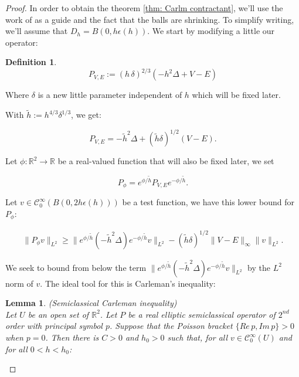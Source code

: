 \documentclass[leqno,11pt,letterpaper, english]{amsart}
\theoremstyle{plain}
\newtheorem{lem}[prop]{Lemma}
\theoremstyle{definition}
\newtheorem{defn}[prop]{Definition}
\numberwithin{equation}{section}
\def\R{\mathbb R}
\begin{document}
	\begin{proof}
		
		In order to obtain the theorem \ref{thm: Carlm contractant}, we'll use the work of \cite{kloppSemiclassicalResolventEstimates2019a} as a guide and the fact that the balls are shrinking. To simplify writing, we'll assume that $D_h=B(0,h\epsilon(h))$. 
		We start by modifying a little our operator:
		
		\begin{defn}
			
			\begin{equation}
				P_{V,E}:= \left(h\,\delta\right)^{2/3}(-h^2 \Delta+V-E)
			\end{equation}
			
			Where $\delta$ is a new little parameter independent of $h$ which will be fixed later.
		\end{defn}
		
		With $\tilde{h}:=h^{4/3}\delta^{1/3}$, we get:
		
		\begin{equation}
			P_{V,E}=-\tilde{h}^2\Delta +\left(\tilde{h}\delta\right)^{1/2}(V-E).
		\end{equation}
		
		Let $\phi:\mathbb{R}^2 \rightarrow \mathbb{R}$ be a real-valued function that will also be fixed later, we set
		
		\begin{equation}
			P_\phi=e^{\phi/\tilde{h}}P_{V,E} e^{-\phi/\tilde{h}}.
		\end{equation}
		
		Let $v\in \mathcal{C}_0^\infty(B(0,2h\epsilon(h)))$ be a test function, we have this lower bound for $P_\phi$:
		
		\begin{align}
			\label{eq: inég carleman V Linfini}
			\lVert P_\phi v\lVert_{L^2}\geq \lVert e^{\phi/\tilde{h}}(-\tilde{h}^2 \Delta)e^{-\phi/\tilde{h}} v\lVert_{L^2}- \left(\tilde{h}\delta\right)^{1/2}\lVert V-E \lVert_\infty \lVert v\lVert_{L^2}.
		\end{align}
		
		We seek to bound from below the term  $\lVert e^{\phi/\tilde{h}}(-\tilde{h}^2 \Delta)e^{-\phi/\tilde{h}} v\lVert_{L^2}$ by the $L^2$ norm of $v$. The ideal tool for this is Carleman's inequality:
		
		\begin{lem}(Semiclassical Carleman inequality)\\
			Let $U$ be an open set of $\R^2$. Let $P$ be a real elliptic semiclassical operator of $2^{nd}$order with principal symbol $p$. Suppose that the Poisson bracket $\{Re\, p, Im\, p \}>0$ when $p=0$. Then there is $C>0$ and $h_0>0$ such that, for all $v\in \mathcal{C}_{0}^{\infty}(U)$ and for all $0<h<h_0$:
			

\end{lem}
\end{proof}
\end{document}
